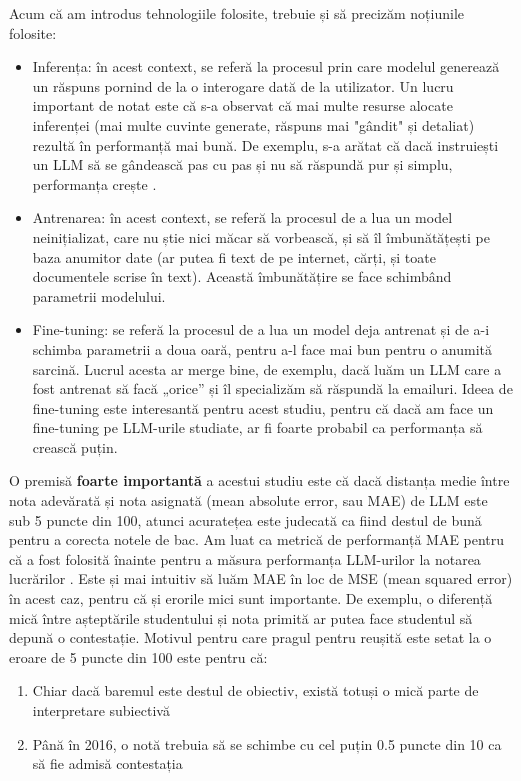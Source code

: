 Acum că am introdus tehnologiile folosite, trebuie și să precizăm noțiunile folosite:
\begin{itemize}
\item Inferența: în acest context, se referă la procesul prin care modelul generează un răspuns pornind de la o interogare dată de la utilizator.
Un lucru important de notat este că s-a observat că mai multe resurse alocate inferenței (mai multe cuvinte generate,
răspuns mai "gândit" și detaliat)
rezultă în performanță mai bună. De exemplu, s-a arătat că dacă instruiești un LLM să se gândească pas cu pas și nu să răspundă pur și simplu, performanța crește \cite{cot}.

\item Antrenarea: în acest context, se referă la procesul de a lua un model neinițializat, care nu știe nici măcar să vorbească, și să
îl îmbunătățești pe baza anumitor date (ar putea fi text de pe internet, cărți, și toate documentele scrise în text). Această îmbunătățire se face schimbând parametrii modelului.

\item Fine-tuning: se referă la procesul de a lua un model deja antrenat și de a-i schimba parametrii a doua oară, pentru a-l face mai bun
pentru o anumită sarcină. Lucrul acesta ar merge bine, de exemplu, dacă luăm un LLM care a fost antrenat să facă „orice” și îl specializăm să
răspundă la emailuri. Ideea de fine-tuning este interesantă pentru acest studiu, pentru că dacă am face un fine-tuning pe LLM-urile studiate,
ar fi foarte probabil ca performanța să crească puțin.
\end{itemize}

O premisă \textbf{foarte importantă} a acestui studiu este că dacă distanța medie între nota adevărată și nota asignată (mean absolute error, sau MAE) de LLM este sub 5 puncte din 100,
atunci acuratețea este judecată ca fiind destul de bună pentru a corecta notele de bac.
Am luat ca metrică de performanță MAE pentru că a fost folosită înainte pentru a măsura performanța LLM-urilor la notarea lucrărilor \cite{golchin}.
Este și mai intuitiv să luăm MAE în loc de MSE (mean squared error) în acest caz, pentru că și erorile mici sunt importante. De exemplu, o diferență
mică între așteptările studentului și nota primită ar
putea face studentul să depună o contestație. Motivul pentru care pragul pentru reușită este setat la o eroare de 5 puncte din 100 este pentru că:
\begin{enumerate}
\item Chiar dacă baremul este destul de obiectiv, există totuși o mică parte de interpretare subiectivă
\item Până în 2016, o notă trebuia să se schimbe cu cel puțin 0.5 puncte din 10 ca să fie admisă contestația
\end{enumerate}


